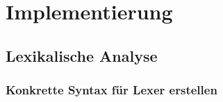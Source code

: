 
\chapter{Implementierung}
\label{ch:implementierung}

\section{Lexikalische Analyse}
\subsection{Konkrette Syntax für Lexer erstellen}

